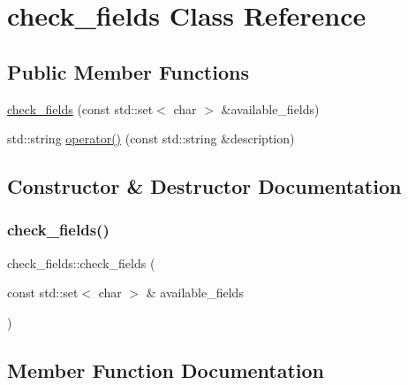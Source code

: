 \hypertarget{classcheck__fields}{}\section{check\+\_\+fields Class Reference}
\label{classcheck__fields}
\subsection*{Public Member Functions}
\begin{DoxyCompactItemize}
\item 
\mbox{\hyperlink{classcheck__fields_a37a0409898667aad8601e57685252870}{check\+\_\+fields}} (const std\+::set$<$ char $>$ \&available\+\_\+fields)
\item 
std\+::string \mbox{\hyperlink{classcheck__fields_a7c9211374f47a59c3b796a1036bf3d96}{operator()}} (const std\+::string \&description)
\end{DoxyCompactItemize}


\subsection{Constructor \& Destructor Documentation}
\mbox{\label{classcheck__fields_a37a0409898667aad8601e57685252870}} 
\subsubsection{\texorpdfstring{check\+\_\+fields()}{check\_fields()}}
{\footnotesize\ttfamily check\+\_\+fields\+::check\+\_\+fields (\begin{DoxyParamCaption}\item[{const std\+::set$<$ char $>$ \&}]{available\+\_\+fields }\end{DoxyParamCaption})\hspace{0.3cm}{\ttfamily [inline]}}



\subsection{Member Function Documentation}
\mbox{\label{classcheck__fields_a7c9211374f47a59c3b796a1036bf3d96}} 
